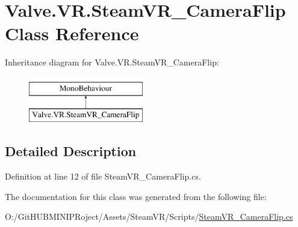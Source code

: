 \hypertarget{class_valve_1_1_v_r_1_1_steam_v_r___camera_flip}{}\section{Valve.\+V\+R.\+Steam\+V\+R\+\_\+\+Camera\+Flip Class Reference}
\label{class_valve_1_1_v_r_1_1_steam_v_r___camera_flip}
Inheritance diagram for Valve.\+V\+R.\+Steam\+V\+R\+\_\+\+Camera\+Flip\+:\begin{figure}[H]
\begin{center}
\leavevmode
\includegraphics[height=2.000000cm]{class_valve_1_1_v_r_1_1_steam_v_r___camera_flip}
\end{center}
\end{figure}


\subsection{Detailed Description}


Definition at line 12 of file Steam\+V\+R\+\_\+\+Camera\+Flip.\+cs.



The documentation for this class was generated from the following file\+:\begin{DoxyCompactItemize}
\item 
O\+:/\+Git\+H\+U\+B\+M\+I\+N\+I\+P\+Roject/\+Assets/\+Steam\+V\+R/\+Scripts/\mbox{\hyperlink{_steam_v_r___camera_flip_8cs}{Steam\+V\+R\+\_\+\+Camera\+Flip.\+cs}}\end{DoxyCompactItemize}
